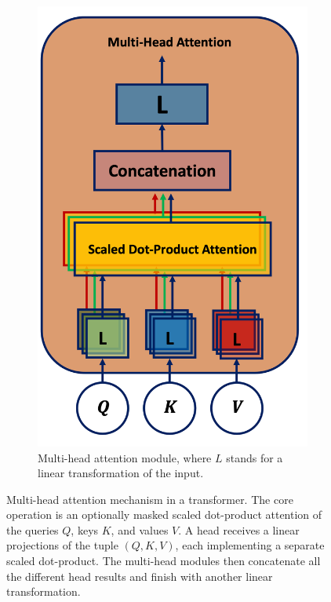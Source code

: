 \begin{figure}[h!]
\begin{subfigure}[b]{0.5\textwidth}
        \includegraphics[scale=0.65]{Images/ML/multiHeadAtt.png}
        \caption{Multi-head attention module, where $L$ stands for a linear transformation of the input.} 
        \label{fig:mulitheadAtt}
    \end{subfigure}
    \caption{Multi-head attention mechanism in a transformer. The core operation is an optionally masked scaled dot-product attention of the queries $Q$, keys $K$, and values $V$. A head receives a linear projections of the tuple $(Q, K, V)$, each implementing a separate scaled dot-product. The multi-head modules then concatenate all the different head results and finish with another linear transformation.}
    \label{fig:transAtt}
\end{figure} 

